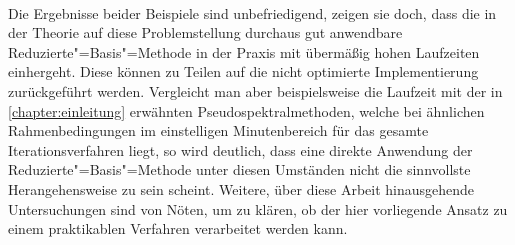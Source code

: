 \documentclass[../main.tex]{subfiles}
\begin{document}
\paragraph{}
Die Ergebnisse beider Beispiele sind unbefriedigend, zeigen sie doch, dass die in der Theorie auf diese Problemstellung durchaus gut anwendbare Reduzierte"=Basis"=Methode in der Praxis mit übermäßig hohen Laufzeiten einhergeht.
Diese können zu Teilen auf die nicht optimierte Implementierung zurückgeführt werden.
Vergleicht man aber beispielsweise die Laufzeit mit der in \cref{chapter:einleitung} erwähnten Pseudospektralmethoden, welche bei ähnlichen Rahmenbedingungen im einstelligen Minutenbereich für das gesamte Iterationsverfahren liegt, so wird deutlich, dass eine direkte Anwendung der Reduzierte"=Basis"=Methode unter diesen Umständen nicht die sinnvollste Herangehensweise zu sein scheint.
Weitere, über diese Arbeit hinausgehende Untersuchungen sind von Nöten, um zu klären, ob der hier vorliegende Ansatz zu einem praktikablen Verfahren verarbeitet werden kann.
\end{document}
